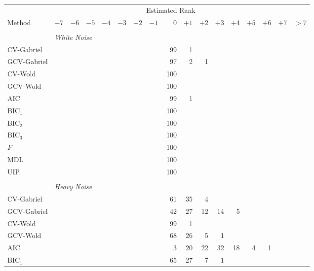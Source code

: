 \begin{table}
    \tiny
    \begin{tabular}{lrrrrrrrrrrrrrrrr}
        \toprule
        &\multicolumn{15}{c}{\scriptsize{Estimated Rank}} \\
        \cmidrule{2-17}
        \scriptsize{Method}
            & $-7$ & $-6$ & $-5$ & $-4$ & $-3$ & $-2$ & $-1$ 
            & $\phantom{+}0$ 
            & $+1$ & $+2$ & $+3$ & $+4$ & $+5$ & $+6$ & $+7$ & $> 7$ \\
        \midrule
        \\
        &\multicolumn{16}{l}{\scriptsize{\textit{White Noise}}} \\
 CV-Gabriel &  &  &  &  &  &  &  &  99 &  1 &  &  &  &  &  &  & \\ 
 GCV-Gabriel &  &  &  &  &  &  &  &  97 &  2 &  1 &  &  &  &  &  & \\ 
 CV-Wold &  &  &  &  &  &  &  &  100 &  &  &  &  &  &  &  & \\ 
 GCV-Wold &  &  &  &  &  &  &  &  100 &  &  &  &  &  &  &  & \\ 
 AIC &  &  &  &  &  &  &  &  99 &  1 &  &  &  &  &  &  & \\ 
 BIC$_1$ &  &  &  &  &  &  &  &  100 &  &  &  &  &  &  &  & \\ 
 BIC$_2$ &  &  &  &  &  &  &  &  100 &  &  &  &  &  &  &  & \\ 
 BIC$_3$ &  &  &  &  &  &  &  &  100 &  &  &  &  &  &  &  & \\ 
 $F$ &  &  &  &  &  &  &  &  100 &  &  &  &  &  &  &  & \\ 
 MDL &  &  &  &  &  &  &  &  100 &  &  &  &  &  &  &  & \\ 
 UIP &  &  &  &  &  &  &  &  100 &  &  &  &  &  &  &  & \\ 
        \\
        &\multicolumn{16}{l}{\scriptsize{\textit{Heavy Noise}}} \\
CV-Gabriel &  &  &  &  &  &  &  &  61 &  35 &  4 &  &  &  &  &  & \\ 
 GCV-Gabriel &  &  &  &  &  &  &  &  42 &  27 &  12 &  14 &  5 &  &  &  & \\ 
 CV-Wold &  &  &  &  &  &  &  &  99 &  1 &  &  &  &  &  &  & \\ 
 GCV-Wold &  &  &  &  &  &  &  &  68 &  26 &  5 &  1 &  &  &  &  & \\ 
 AIC &  &  &  &  &  &  &  &  3 &  20 &  22 &  32 &  18 &  4 &  1 &  & \\ 
 BIC$_1$ &  &  &  &  &  &  &  &  65 &  27 &  7 &  1 &  &  &  &  & \\ 

\end{tabular}
\end{table}
